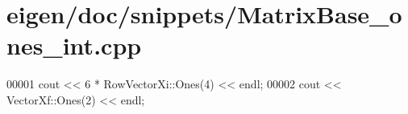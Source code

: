 \hypertarget{eigen_2doc_2snippets_2_matrix_base__ones__int_8cpp_source}{}\section{eigen/doc/snippets/\+Matrix\+Base\+\_\+ones\+\_\+int.cpp}
\label{eigen_2doc_2snippets_2_matrix_base__ones__int_8cpp_source}

\begin{DoxyCode}
00001 cout << 6 * RowVectorXi::Ones(4) << endl;
00002 cout << VectorXf::Ones(2) << endl;
\end{DoxyCode}
